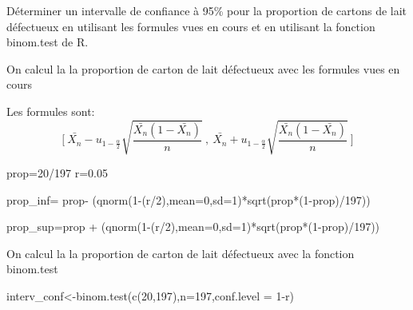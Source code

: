 \documentclass[
]{article}
\newenvironment{Shaded}{\begin{snugshade}}{\end{snugshade}}
\newcommand{\AttributeTok}[1]{\textcolor[rgb]{0.77,0.63,0.00}{#1}}
\newcommand{\DecValTok}[1]{\textcolor[rgb]{0.00,0.00,0.81}{#1}}
\newcommand{\FloatTok}[1]{\textcolor[rgb]{0.00,0.00,0.81}{#1}}
\newcommand{\FunctionTok}[1]{\textcolor[rgb]{0.00,0.00,0.00}{#1}}
\newcommand{\NormalTok}[1]{#1}
\newcommand{\OtherTok}[1]{\textcolor[rgb]{0.56,0.35,0.01}{#1}}
\newcommand{\SpecialCharTok}[1]{\textcolor[rgb]{0.00,0.00,0.00}{#1}}
\begin{document}
Déterminer un intervalle de confiance à 95\% pour la proportion de
cartons de lait défectueux en utilisant les formules vues en cours et en
utilisant la fonction binom.test de R.

On calcul la la proportion de carton de lait défectueux avec les
formules vues en cours

Les formules sont:
\[\Bigg[\ \bar{X_n} - u_{1-\frac\alpha 2} \sqrt{ \frac{\bar{X_n}(1-\bar{X_n})}{n}}\ ,\ \bar{X_n} + u_{1-\frac\alpha 2} \sqrt{ \frac{\bar{X_n}(1-\bar{X_n})}{n}}\ \Bigg]\]

\begin{Shaded}
\begin{Highlighting}[]
\NormalTok{prop}\OtherTok{=}\DecValTok{20}\SpecialCharTok{/}\DecValTok{197}
\NormalTok{r}\OtherTok{=}\FloatTok{0.05}

\NormalTok{prop\_inf}\OtherTok{=}\NormalTok{ prop}\SpecialCharTok{{-}}\NormalTok{ (}\FunctionTok{qnorm}\NormalTok{(}\DecValTok{1}\SpecialCharTok{{-}}\NormalTok{(r}\SpecialCharTok{/}\DecValTok{2}\NormalTok{),}\AttributeTok{mean=}\DecValTok{0}\NormalTok{,}\AttributeTok{sd=}\DecValTok{1}\NormalTok{)}\SpecialCharTok{*}\FunctionTok{sqrt}\NormalTok{(prop}\SpecialCharTok{*}\NormalTok{(}\DecValTok{1}\SpecialCharTok{{-}}\NormalTok{prop)}\SpecialCharTok{/}\DecValTok{197}\NormalTok{))}

\NormalTok{prop\_sup}\OtherTok{=}\NormalTok{prop }\SpecialCharTok{+}\NormalTok{ (}\FunctionTok{qnorm}\NormalTok{(}\DecValTok{1}\SpecialCharTok{{-}}\NormalTok{(r}\SpecialCharTok{/}\DecValTok{2}\NormalTok{),}\AttributeTok{mean=}\DecValTok{0}\NormalTok{,}\AttributeTok{sd=}\DecValTok{1}\NormalTok{)}\SpecialCharTok{*}\FunctionTok{sqrt}\NormalTok{(prop}\SpecialCharTok{*}\NormalTok{(}\DecValTok{1}\SpecialCharTok{{-}}\NormalTok{prop)}\SpecialCharTok{/}\DecValTok{197}\NormalTok{))}
\end{Highlighting}
\end{Shaded}

On calcul la la proportion de carton de lait défectueux avec la fonction
binom.test

\begin{Shaded}
\begin{Highlighting}[]
\NormalTok{interv\_conf}\OtherTok{\textless{}{-}}\FunctionTok{binom.test}\NormalTok{(}\FunctionTok{c}\NormalTok{(}\DecValTok{20}\NormalTok{,}\DecValTok{197}\NormalTok{),}\AttributeTok{n=}\DecValTok{197}\NormalTok{,}\AttributeTok{conf.level =} \DecValTok{1}\SpecialCharTok{{-}}\NormalTok{r)}
\end{Highlighting}
\end{Shaded}
\end{document}
